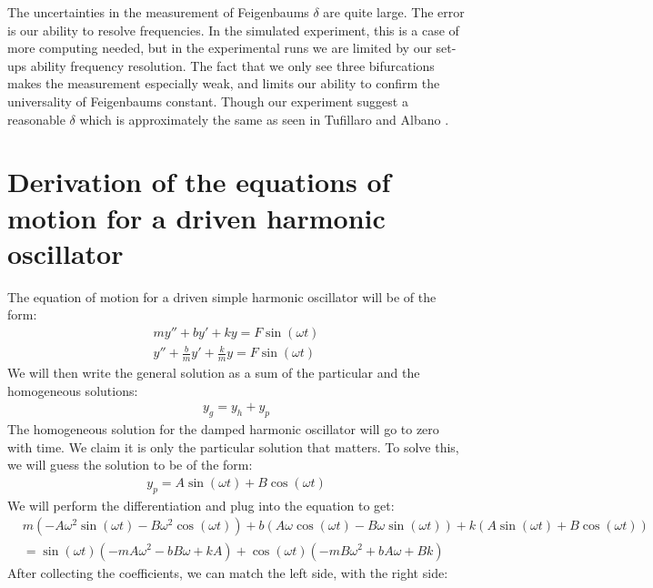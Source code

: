 \documentclass[12pt,oneside,a4paper]{article}
\numberwithin{equation}{section}
\begin{document}
{{{{The uncertainties in the measurement of Feigenbaums $\delta$ are quite large. The error is our ability to resolve frequencies. In the simulated experiment, this is a case of more computing needed, but in the experimental runs we are limited by our set-ups ability frequency resolution. The fact that we only see three bifurcations makes the measurement especially weak, and limits our ability to confirm the universality of Feigenbaums constant. Though our experiment suggest a reasonable $\delta$ which is approximately the same as seen in Tufillaro and Albano \cite{tufillaro}.
\newpage



\newpage
\appendix
\section{Derivation of the equations of motion for a driven harmonic oscillator}
\label{driven}
The equation of motion for a driven simple harmonic oscillator will be of the form:
\begin{align*}
my'' + by' + ky = F\sin(\omega t)\\
y'' + \frac{b}{m}y' + \frac{k}{m} y = F \sin(\omega t)
\end{align*}
We will then write the general solution as a sum of the particular and the homogeneous solutions:
\begin{align*}
y_g = y_{h} + y_p
\end{align*}
The homogeneous solution for the damped harmonic oscillator will go to zero with time. We claim it is only the particular solution that matters. To solve this, we will guess the solution to be of the form:
\begin{align*}
y_p = A \sin (\omega t) + B \cos(\omega t)
\end{align*}
We will perform the differentiation and plug into the equation to get:
\begin{align*}
&m\left(-A\omega^2\sin(\omega t) - B\omega^2\cos(\omega t)\right) + b\left(A\omega\cos(\omega t) - B\omega\sin(\omega t)\right) + k\left( A\sin(\omega t) + B\cos(\omega t) \right)\\
&=\sin(\omega t) \left( -mA\omega^2 -bB\omega + kA \right) + \cos(\omega t)\left(-mB\omega^2 + bA\omega + Bk\right)
\end{align*}
After collecting the coefficients, we can match the left side, with the right side:
\begin{align}

\end{align}}}}}
\end{document}
